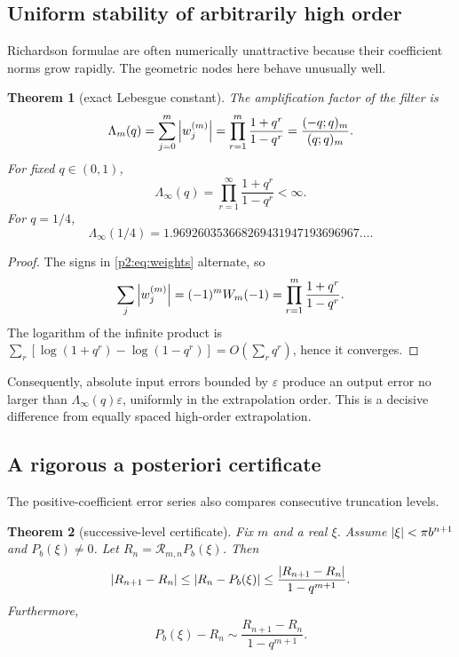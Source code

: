 \documentclass[11pt,oneside]{article}
\numberwithin{equation}{section}
\newtheorem{theorem}{Theorem}[section]
\theoremstyle{definition}
\theoremstyle{remark}
\begin{document}
\subsection{Uniform stability of arbitrarily high order}

Richardson formulae are often numerically unattractive because their coefficient
norms grow rapidly. The geometric nodes here behave unusually well.

\begin{theorem}[exact Lebesgue constant]
\label{p2:thm:stability}
The amplification factor of the filter is
\begin{equation}
 \Lambda_m(q)=\sum_{j=0}^m\left\lvert w_j^{(m)}\right\rvert
 =\prod_{r=1}^m\frac{1+q^r}{1-q^r}
 =\frac{(-q;q)_m}{(q;q)_m}.
 \label{p2:eq:Lebesgue}
\end{equation}
For fixed \(q\in(0,1)\),
\begin{equation}
 \Lambda_\infty(q)=\prod_{r=1}^{\infty}\frac{1+q^r}{1-q^r}<\infty.
 \label{p2:eq:LebesgueInf}
\end{equation}
For \(q=1/4\),
\begin{equation}
 \Lambda_\infty(1/4)
 =1.969260353668269431947193696967\ldots.
 \label{p2:eq:LambdaQuarter}
\end{equation}
\end{theorem}

\begin{proof}
The signs in \eqref{p2:eq:weights} alternate, so
\[
 \sum_j\left\lvert w_j^{(m)}\right\rvert=(-1)^mW_m(-1)
 =\prod_{r=1}^m\frac{1+q^r}{1-q^r}.
\]
The logarithm of the infinite product is
\(\sum_r[\log(1+q^r)-\log(1-q^r)]=O(\sum_rq^r)\), hence it converges.
\end{proof}

Consequently, absolute input errors bounded by \(\varepsilon\) produce an output
error no larger than \(\Lambda_\infty(q)\varepsilon\), uniformly in the
extrapolation order. This is a decisive difference from equally spaced
high-order extrapolation.

\subsection{A rigorous a posteriori certificate}

The positive-coefficient error series also compares consecutive truncation
levels.

\begin{theorem}[successive-level certificate]
\label{p2:thm:certificate}
Fix \(m\) and a real \(\xi\). Assume
\(\left\lvert \xi\right\rvert<\pi b^{n+1}\) and \(P_b(\xi)\ne0\). Let
\(R_n=\mathcal R_{m,n}P_b(\xi)\). Then
\begin{equation}
 \left\lvert R_{n+1}-R_n\right\rvert
 \leq \left\lvert R_n-P_b(\xi)\right\rvert
 \leq \frac{\left\lvert R_{n+1}-R_n\right\rvert}{1-q^{m+1}}.
 \label{p2:eq:certificate}
\end{equation}
Furthermore,
\begin{equation}
 P_b(\xi)-R_n
 \sim \frac{R_{n+1}-R_n}{1-q^{m+1}}.
 \label{p2:eq:asympest}
\end{equation}
\end{theorem}
\end{document}
